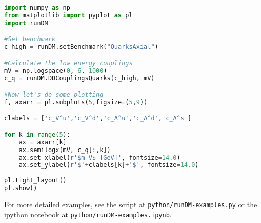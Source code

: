 \documentclass[notitlepage,12pt]{article}
\begin{document}
\begin{lstlisting}[language=Python]
import numpy as np
from matplotlib import pyplot as pl
import runDM

#Set benchmark
c_high = runDM.setBenchmark("QuarksAxial")

#Calculate the low energy couplings
mV = np.logspace(0, 6, 1000)
c_q = runDM.DDCouplingsQuarks(c_high, mV)

#Now let's do some plotting
f, axarr = pl.subplots(5,figsize=(5,9))

clabels = ['c_V^u','c_V^d','c_A^u','c_A^d','c_A^s']

for k in range(5):
    ax = axarr[k]
    ax.semilogx(mV, c_q[:,k])
    ax.set_xlabel(r'$m_V$ [GeV]', fontsize=14.0)
    ax.set_ylabel(r'$'+clabels[k]+'$', fontsize=14.0)
    
pl.tight_layout()
pl.show()
\end{lstlisting}
For more detailed examples, see the script at \texttt{python/runDM-examples.py} or the ipython notebook at \texttt{python/runDM-examples.ipynb}.
\end{document}
